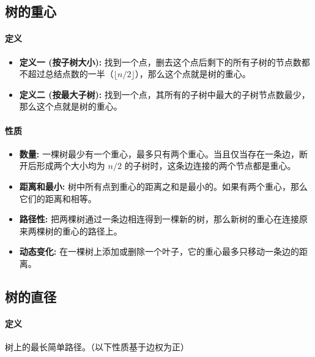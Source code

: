 
\begin{spacing}{0.95} %
	\large %
	
	\subsection{树的重心}
	\paragraph{定义}
	\begin{itemize}
		\item \textbf{定义一 (按子树大小):} 找到一个点，删去这个点后剩下的所有子树的节点数都不超过总结点数的一半（$\lfloor n/2 \rfloor$），那么这个点就是树的重心。
		\item \textbf{定义二 (按最大子树):} 找到一个点，其所有的子树中最大的子树节点数最少，那么这个点就是树的重心。
	\end{itemize}
	
	\paragraph{性质}
	\begin{itemize}
		\item \textbf{数量:} 一棵树最少有一个重心，最多只有两个重心。当且仅当存在一条边，断开后形成两个大小均为 $n/2$ 的子树时，这条边连接的两个节点都是重心。
		\item \textbf{距离和最小:} 树中所有点到重心的距离之和是最小的。如果有两个重心，那么它们的距离和相等。
		\item \textbf{路径性:} 把两棵树通过一条边相连得到一棵新的树，那么新树的重心在连接原来两棵树的重心的路径上。
		\item \textbf{动态变化:} 在一棵树上添加或删除一个叶子，它的重心最多只移动一条边的距离。
	\end{itemize}
	
	\subsection{树的直径}
	\paragraph{定义}
	树上的最长简单路径。（以下性质基于边权为正）
	

\end{spacing}
